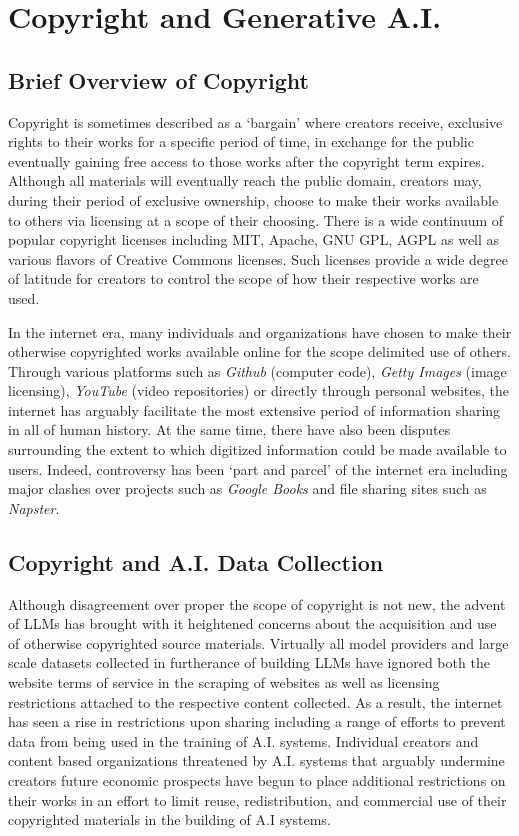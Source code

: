 \section{Copyright and Generative A.I.}
\subsection{Brief Overview of Copyright}
Copyright is sometimes described as a `bargain’ where creators receive, exclusive rights to their works for a specific period of time, in exchange for the public eventually gaining free access to those works after the copyright term expires.\cite{patterson1991nature} Although all materials will eventually reach the public domain, creators may, during their period of exclusive ownership, choose to make their works available to others via licensing at a scope of their choosing.  There is a wide continuum of popular copyright licenses including MIT, Apache, GNU GPL, AGPL as well as various flavors of Creative Commons licenses.\cite{metzger2015free}  Such licenses provide a wide degree of latitude for creators to control the scope of how their respective works are used.  

In the internet era, many individuals and organizations have chosen to make their otherwise copyrighted works available online for the scope delimited use of others. Through various platforms such as \textit{Github} (computer code), \textit{Getty Images} (image licensing), \textit{YouTube} (video repositories) or directly through personal websites, the internet has arguably facilitate the most extensive period of information sharing in all of human history.  At the same time, there have also been disputes surrounding the extent to which digitized information could be made available to users. Indeed, controversy has been `part and parcel' of the internet era including major clashes over projects such as \textit{Google Books}\cite{samuelson2009google} and file sharing sites such as \textit{Napster}.\cite{rayburn2001after}  

\subsection{Copyright and A.I. Data Collection}
Although disagreement over proper the scope of copyright is not new, the advent of LLMs has brought with it heightened concerns about the acquisition and use of otherwise copyrighted source materials.\cite{samuelson2023generative}  Virtually all model providers and large scale datasets collected in furtherance of building LLMs have ignored both the website terms of service in the scraping of websites as well as licensing restrictions attached to the respective content collected.\cite{longpre2024large}  As a result, the internet has seen a rise in restrictions upon sharing including a range of efforts to prevent data from being used in the training of A.I. systems.\cite{longpre2024consent}  
Individual creators and content based organizations threatened by A.I. systems that arguably undermine creators future economic prospects have begun to place additional restrictions on their works in an effort to limit reuse, redistribution, and commercial use of their copyrighted materials in the building of A.I systems.\cite{longpre2024consent}

